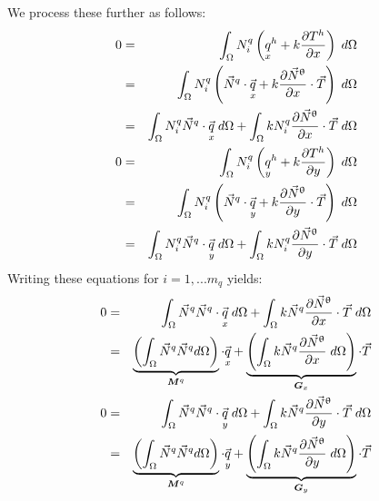 We process these further as follows:
\begin{eqnarray}
0&=&\int_\Omega N_i^q \left( \underset{\tiny x}{q}^h + k  \frac{\partial T^h}{\partial x} \right) \; d\Omega  \nonumber\\
&=& \int_\Omega N_i^q \left( \vec{N}^q \cdot \vec{\underset{\tiny x}{q}} 
+ k  \frac{\partial \vec{N}^\uptheta}{\partial x} \cdot \vec{T} \right) \; d\Omega \nonumber\\ 
&=& \int_\Omega N_i^q \vec{N}^q \cdot \vec{\underset{\tiny x}{q}} \; d\Omega  
+ \int _\Omega k N_i^q   \frac{\partial \vec{N}^\uptheta}{\partial x}\cdot \vec{T} \;  d\Omega \nonumber\\ 
0&=&\int_\Omega N_i^q \left( \underset{\tiny y}{q}^h + k  \frac{\partial T^h}{\partial y} \right) \;  d\Omega \nonumber\\
&=& \int_\Omega N_i^q \left( \vec{N}^q \cdot \vec{\underset{\tiny y}{q}} 
+ k  \frac{\partial \vec{N}^\uptheta}{\partial y} \cdot \vec{T} \right) \;  d\Omega \nonumber\\ 
&=& \int_\Omega N_i^q \vec{N}^q \cdot \vec{\underset{\tiny y}{q}} \; d\Omega
+ \int _\Omega k N_i^q   \frac{\partial \vec{N}^\uptheta}{\partial y} \cdot \vec{T} \;  d\Omega 
\end{eqnarray}
Writing these equations for $i=1,...m_q$ yields:
\begin{eqnarray}
0&=& \int_\Omega \vec{N}^q \vec{N}^q \cdot \vec{\underset{\tiny x}{q}} \; d\Omega
+ \int _\Omega k \vec{N}^q   \frac{\partial \vec{N}^\uptheta}{\partial x}\cdot \vec{T} \; d\Omega \nonumber\\ 
&=& \underbrace{\left( \int_\Omega \vec{N}^q \vec{N}^q d\Omega \right)}_{{\bm M}^q}  \cdot \vec{\underset{\tiny x}{q}} 
+ \underbrace{\left(\int _\Omega k \vec{N}^q  \frac{\partial \vec{N}^\uptheta}{\partial x}\; d\Omega\right)}_{{\bm G}_x} \cdot \vec{T} \label{eq:htediff4}\\ 
0&=& \int_\Omega \vec{N}^q \vec{N}^q \cdot \vec{\underset{\tiny y}{q}} \; d\Omega
+ \int _\Omega k \vec{N}^q   \frac{\partial \vec{N}^\uptheta}{\partial y} \cdot \vec{T} \;  d\Omega \nonumber\\ 
&=& \underbrace{\left( \int_\Omega \vec{N}^q \vec{N}^q d\Omega \right)}_{{\bm M}^q}  \cdot \vec{\underset{\tiny y}{q}} 
+ \underbrace{\left(\int _\Omega k \vec{N}^q  \frac{\partial \vec{N}^\uptheta}{\partial y} \; d\Omega\right)}_{{\bm G}_y} \cdot \vec{T} \label{eq:htediff5}
\end{eqnarray}

